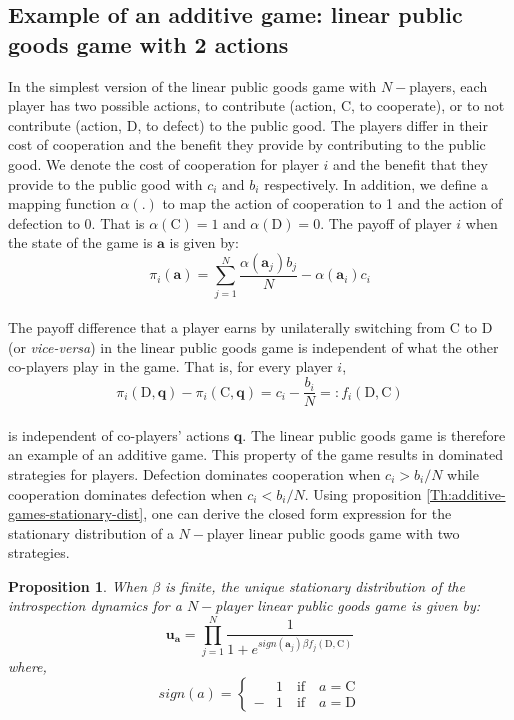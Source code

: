 \documentclass[11pt]{article}
\theoremstyle{plainCl1}
\newtheorem{Prop}{Proposition}
\theoremstyle{plainCl2}
\newcommand{\abf}{\mathbf{a}}
\newcommand{\qbf}{\mathbf{q}}
\newcommand{\ubf}{\mathbf{u}}
\newcommand{\C}{\mathrm{C}}
\newcommand{\D}{\mathrm{D}}
\begin{document}
\subsection*{Example of an additive game: linear public goods game with 2 actions}
In the simplest version of the linear public goods game with $N-$players, each player has two possible actions, to contribute (action, $\C$, to cooperate), or to not contribute (action, $\D$, to defect) to the public good. The players differ in their cost of cooperation and the benefit they provide by contributing to the public good. We denote the cost of cooperation for player $i$ and the benefit that they provide to the public good with $c_i$ and $b_i$ respectively. In addition, we define a mapping function $\alpha(.)$ to map the action of cooperation to 1 and the action of defection to 0. That is $\alpha(\C) = 1$ and $\alpha(\D) = 0$.  The payoff of player $i$ when the state of the game is $\abf$ is given by: \\
\begin{equation}
\pi_i(\abf) = \sum_{j=1}^N \frac{\displaystyle \alpha(\abf_j) b_j}{N} - \alpha(\abf_i) c_i
\label{Eq:linear-pgg-payoff}
\end{equation}
\\
\noindent The payoff difference that a player earns by unilaterally switching from $\C$ to $\D$ (or \emph{vice-versa}) in the linear public goods game is independent of what the other co-players play in the game. That is, for every player $i$,
\begin{equation}
\pi_i(\D, \qbf) - \pi_i(\C, \qbf) = c_i - \frac{b_i}{N} =: f_i(\D, \C) 
\label{Eq:difference-payoffs-lpgg}
\end{equation}\\
\noindent is independent of co-players' actions $\qbf$. The linear public goods game is therefore an example of an additive game. This property of the game results in dominated strategies for players. Defection dominates cooperation when $c_i > b_i/N$ while cooperation dominates defection when $c_i < b_i/N$. Using proposition \ref{Th:additive-games-stationary-dist}, one can derive the closed form expression for the stationary distribution of a $N-$player linear public goods game with two strategies. 
\begin{Prop}
\label{prop:stationary-dist-lpgg}
When $\beta$ is finite, the unique stationary distribution of the introspection dynamics for a $N-$player linear public goods game is given by: 
\\
\begin{equation}
\ubf_\abf = \prod_{j = 1}^{N} \frac{1}{1 + \displaystyle e^{\mathit{sign}(\abf_j)\beta f_j(\D, \C )}} 
\label{Eq:stationary_dist_lpgg}
\end{equation}
where, 
\begin{equation}
\label{Eq:sign-function}
\mathit{sign}(a) =
\begin{cases}
&1 \quad \text{if} \quad a = \C \\
-&1 \quad \text{if} \quad a = \D
\end{cases}
\end{equation}
\end{Prop}
\end{document}
